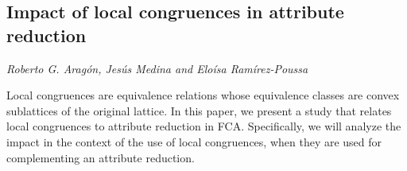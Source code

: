 \documentclass[../booklet.tex]{subfiles}
\begin{document}
\subsection[Impact of local congruences in attribute reduction. {\it Roberto G. Aragón, Jesús Medina and Eloísa Ramírez-Poussa}]{Impact of local congruences in attribute reduction}
  

\begin{center}
  {\it Roberto G. Aragón, Jesús Medina and Eloísa Ramírez-Poussa}
\end{center}



Local congruences are equivalence relations whose equivalence classes are convex sublattices of the original lattice. In this paper, we present a study that relates local congruences to attribute reduction in FCA. Specifically,   we will analyze the impact in the context of the use of local congruences, when they are used  for complementing an attribute reduction.


\end{document}
